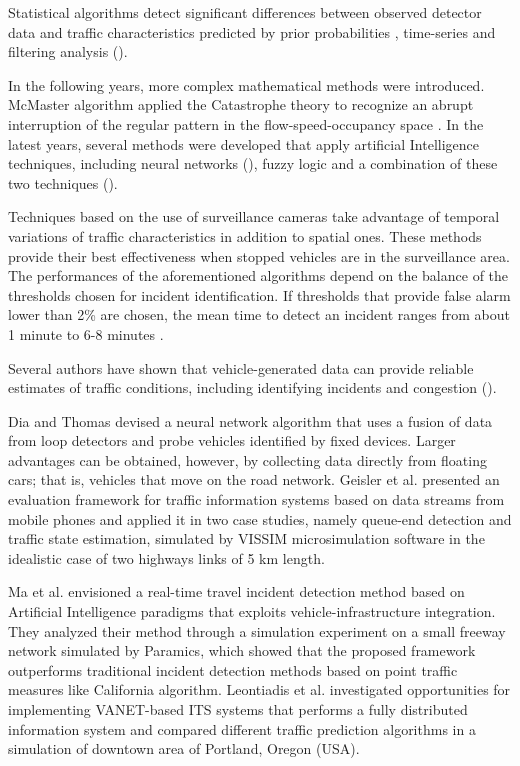 \documentclass[conference]{IEEEtran}
\begin{document}
Statistical algorithms detect significant differences between observed detector data and traffic characteristics predicted by prior probabilities \cite{dudek1974incident}, time-series and filtering analysis (\cite{ahmed1982application}\cite{stephanedes1993freeway}).

In the following years, more complex mathematical methods were introduced. McMaster algorithm applied the Catastrophe theory to recognize an abrupt interruption of the regular pattern in the flow-speed-occupancy space \cite{persaud1990congestion}.
In the latest years, several methods were developed that apply artificial Intelligence techniques, including neural networks (\cite{stephanedes1995artificial}\cite{adeli2000adaptive}), fuzzy logic \cite{lin1998development} and a combination of these two techniques (\cite{hsiao1994application}\cite{ishak1998fuzzy}).

Techniques based on the use of surveillance cameras take advantage of temporal variations of traffic characteristics in addition to spatial ones. These methods provide their best effectiveness when stopped vehicles are in the surveillance area.
The performances of the aforementioned algorithms depend on the balance of the thresholds chosen for incident identification. If thresholds that provide false alarm lower than 2\% are chosen, the mean time to detect an incident ranges from about 1 minute to 6-8 minutes \cite{mahmassani1795evaluation}.

Several authors have shown that vehicle-generated data can provide reliable estimates of traffic conditions, including identifying incidents and congestion (\cite{sermons1996use}\cite{long2002probe}).

Dia and Thomas \cite{dia2011development} devised a neural network algorithm that uses a fusion of data from loop detectors and probe vehicles identified by fixed devices. Larger advantages can be obtained, however, by collecting data directly from floating cars; that is, vehicles that move on the road network.
Geisler et al. \cite{geisler2012evaluation} presented an evaluation framework for traffic information systems based on data streams from mobile phones and applied it in two case studies, namely queue-end detection and traffic state estimation, simulated by VISSIM microsimulation software in the idealistic case of two highways links of 5 km length.

Ma et al. \cite{ma2009real} envisioned a real-time travel incident detection method based on Artificial Intelligence paradigms that exploits vehicle-infrastructure integration. They analyzed their method through a simulation experiment on a small freeway network simulated by Paramics, which showed that the proposed framework outperforms traditional incident detection methods based on point traffic measures like California algorithm. Leontiadis et al. \cite{leontiadis2011effectiveness} investigated opportunities for implementing VANET-based ITS systems that performs a fully distributed information system and compared different traffic prediction algorithms in a simulation of downtown area of Portland, Oregon (USA).
\end{document}
